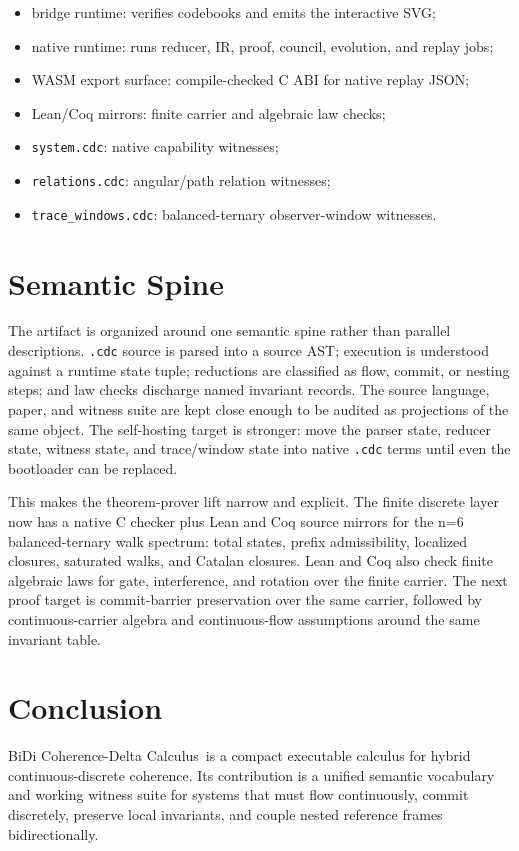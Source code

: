 \documentclass[11pt]{article}
\newcommand{\CDC}{BiDi Coherence-Delta Calculus}
\begin{document}
\begin{itemize}
\item bridge runtime: verifies codebooks and emits the interactive SVG;
\item native runtime: runs reducer, IR, proof, council, evolution, and replay jobs;
\item WASM export surface: compile-checked C ABI for native replay JSON;
\item Lean/Coq mirrors: finite carrier and algebraic law checks;
\item \texttt{system.cdc}: native capability witnesses;
\item \texttt{relations.cdc}: angular/path relation witnesses;
\item \texttt{trace\_windows.cdc}: balanced-ternary observer-window witnesses.
\end{itemize}

\section{Semantic Spine}

The artifact is organized around one semantic spine rather than parallel
descriptions. \texttt{.cdc} source is parsed into a source AST; execution is
understood against a runtime state tuple; reductions are classified as flow,
commit, or nesting steps; and law checks discharge named invariant records. The
source language, paper, and witness suite are kept close enough to be audited as
projections of the same object. The self-hosting target is stronger: move the
parser state, reducer state, witness state, and trace/window state into native
\texttt{.cdc} terms until even the bootloader can be replaced.

This makes the theorem-prover lift narrow and explicit. The finite discrete
layer now has a native C checker plus Lean and Coq source mirrors for the n=6
balanced-ternary walk spectrum: total states, prefix admissibility, localized
closures, saturated walks, and Catalan closures. Lean and Coq also check finite
algebraic laws for gate, interference, and rotation over the finite carrier. The
next proof target is commit-barrier preservation over the same carrier, followed
by continuous-carrier algebra and continuous-flow assumptions around the same
invariant table.

\section{Conclusion}

\CDC\ is a compact executable calculus for hybrid continuous-discrete coherence.
Its contribution is a unified semantic vocabulary and working witness suite for
systems that must flow continuously, commit discretely, preserve local
invariants, and couple nested reference frames bidirectionally.
\end{document}
